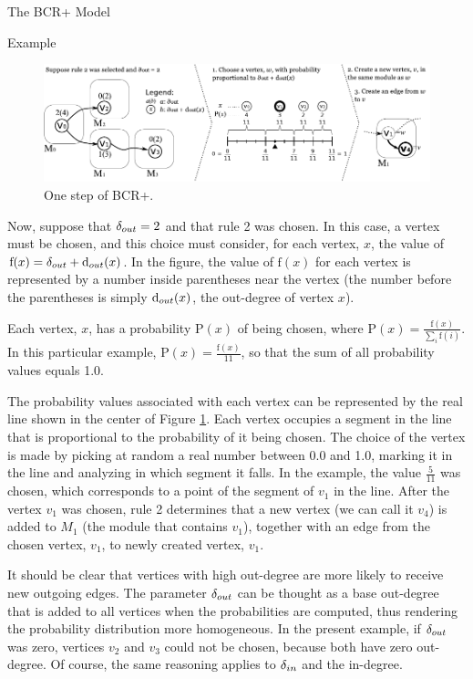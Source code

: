 \documentclass[11pt,twocolumn,a4paper,english]{article}
\begin{document}
\begin{section}{The BCR+ Model}
\begin{subsection}{Example}
\begin{figure}[htbp]
	\centering
		\includegraphics[width=\textwidth]{figures/bcr-example}
	\caption{One step of BCR+.}
	\label{fig:bcr-example}
\end{figure}
	
	Now, suppose that $\delta_{out} = 2$ and that rule 2 was chosen. In this case, a vertex must be chosen, and this choice must consider, for each vertex, $x$, the value of $\mathrm{f}(x) = \delta_{out} + \mathrm{d}_{out}(x)$. In the figure, the value of $\mathrm{f}(x)$ for each vertex is represented by a number inside parentheses near the vertex (the number before the parentheses is simply $\mathrm{d}_{out}(x)$, the out-degree of vertex $x$).
	
	Each vertex, $x$, has a probability $\mathrm{P}(x)$ of being chosen, where $\mathrm{P}(x) = \frac{\mathrm{f}(x)}{\sum_i \mathrm{f}(i)}$. In this particular example, $\mathrm{P}(x) = \frac{\mathrm{f}(x)}{11}$, so that the sum of all probability values equals 1.0.
	
	The probability values associated with each vertex can be represented by the real line shown in the center of Figure \ref{fig:bcr-example}. Each vertex occupies a segment in the line that is proportional to the probability of it being chosen. The choice of the vertex is made by picking at random a real number between 0.0 and 1.0, marking it in the line and analyzing in which segment it falls. In the example, the value $\frac{5}{11}$ was chosen, which corresponds to a point of the segment of $v_1$ in the line. After the vertex $v_1$ was chosen, rule 2 determines that a new vertex (we can call it $v_4$) is added to $M_1$ (the module that contains $v_1$), together with an edge from the chosen vertex, $v_1$, to newly created vertex, $v_1$.
	
	It should be clear that vertices with high out-degree are more likely to receive new outgoing edges. The parameter $\delta_{out}$ can be thought as a base out-degree that is added to all vertices when the probabilities are computed, thus rendering the probability distribution more homogeneous. In the present example, if $\delta_{out}$ was zero, vertices $v_2$ and $v_3$ could not be chosen, because both have zero out-degree. Of course, the same reasoning applies to $\delta_{in}$ and the in-degree.


\end{subsection}
\end{section}
\end{document}
